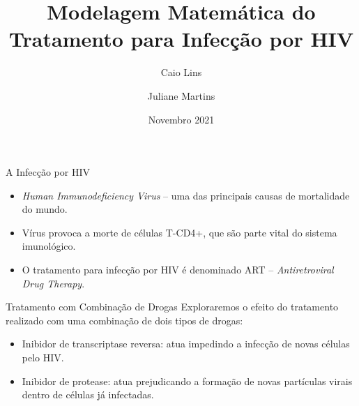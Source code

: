 \documentclass[13pt]{beamer}
\title[Modelagem do Tratamento para HIV]{Modelagem Matemática do Tratamento para Infecção por HIV}
\author[C. Lins, J. Martins]{Caio Lins \and Juliane Martins}
\institute[EMAp]{FGV - EMAp}
\date[EMAp 2021]{Novembro 2021}
\begin{document}
\maketitle

\begin{frame}{A Infecção por HIV}
    \begin{itemize}
        \item<1-> \textit{Human Immunodeficiency Virus} -- uma das principais causas de mortalidade do mundo.

        \item<2-> Vírus provoca a morte de células T-CD4+, que são parte vital do sistema imunológico.

        \item<3-> O tratamento para infecção por HIV é denominado ART -- \textit{Antiretroviral Drug Therapy}.

    \end{itemize}
\end{frame}

\begin{frame}{Tratamento com Combinação de Drogas}
    Exploraremos o efeito do tratamento realizado com uma combinação de dois tipos de drogas:
    \begin{itemize}
        \item<2-> Inibidor de transcriptase reversa: atua impedindo a infecção de novas células pelo HIV.
        \item<3-> Inibidor de protease: atua prejudicando a formação de novas partículas virais dentro de células já infectadas.
    \end{itemize}
\end{frame}
\end{document}

